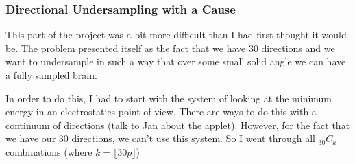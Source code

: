 \documentclass[11 pt]{article}
\begin{document}
    \subsubsection{Directional Undersampling with a Cause}
      This part of the project was a bit more difficult than I had first thought it would be. The problem presented itself as the fact that we have 30 directions and we want to undersample in such a way that over some small solid angle we can have a fully sampled brain. 

      In order to do this, I had to start with the system of looking at the minimum energy in an electrostatics point of view. There are ways to do this with a continuum of directions (talk to Jan about the applet). However, for the fact that we have our 30 directions, we can't use this system. So I went through all $_{30}C_k$ combinations (where $k = \lfloor 30 p \rfloor$)
\end{document}
